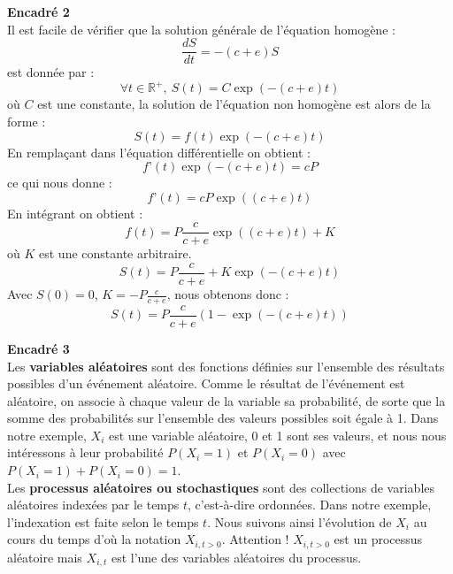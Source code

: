 \setlength{\columnsep}{1cm}
 \begin{minipage}{0.9\linewidth}
 \begin{multicols}{2}
 \textbf{Encadré 2} \\
 Il est facile de vérifier que la solution générale de l’équation homogène :
 \begin{equation}
\nonumber  \frac{dS}{dt}=-(c+e)S
\end{equation}
est donnée par :
 \begin{equation}
\nonumber \forall t \in \mathbb{R}^+,~ S(t)=C\exp(-(c+e)t)
\end{equation}
où $C$ est une constante, la solution de l’équation non homogène est alors de la forme :
 \begin{equation}
\nonumber S(t)=f(t) \exp(-(c+e)t)
\end{equation}
En remplaçant dans l’équation différentielle on obtient :
 \begin{equation}
\nonumber f’(t) \exp(-(c+e)t)= cP
\end{equation}
ce qui nous donne :
 \begin{equation}
\nonumber f’(t)= cP \exp((c+e)t)
\end{equation}
En intégrant on obtient :
 \begin{equation}
\nonumber f(t)= P\frac{c}{c+e} \exp({(c+e)t}) + K
\end{equation}
où $K$ est une constante arbitraire.
 \begin{equation}
\nonumber S(t)= P\frac{c}{c+e} + K\exp(-(c+e)t)
\end{equation}
Avec $S(0)=0$, $K=-P\frac{c}{c+e}$, nous obtenons donc :
 \begin{equation}
\nonumber S(t)= P\frac{c}{c+e} (1-\exp(-(c+e)t))
\end{equation}
\end{multicols}
 \end{minipage}
\vspace{2cm}

\setlength{\columnsep}{1cm}
 \begin{minipage}{0.9\linewidth}
\textbf{Encadré 3} \\
Les \textbf{variables aléatoires} sont des fonctions définies sur l’ensemble des résultats possibles d’un événement aléatoire. Comme le résultat de l’événement est aléatoire, on associe à chaque valeur de la variable sa probabilité, de sorte que la somme des probabilités sur l'ensemble des valeurs possibles soit égale à 1. Dans notre exemple, $X_i$ est une variable aléatoire, 0 et 1 sont ses valeurs, et nous nous intéressons à leur probabilité $P(X_i=1)$ et $P(X_i=0)$ avec $P(X_i=1)+P(X_i=0)=1$. \\
Les \textbf{processus aléatoires ou stochastiques} sont des collections de variables aléatoires indexées par le temps $t$, c'est-à-dire ordonnées. Dans notre exemple, l'indexation est faite selon le temps $t$. Nous suivons ainsi l'évolution de $X_i$ au cours du temps d'où la notation $X_{i,t>0}$. Attention ! $X_{i,t>0}$ est un processus aléatoire mais $X_{i,t}$ est l'une des variables aléatoires du processus.
 \end{minipage}
\vspace{2cm}

